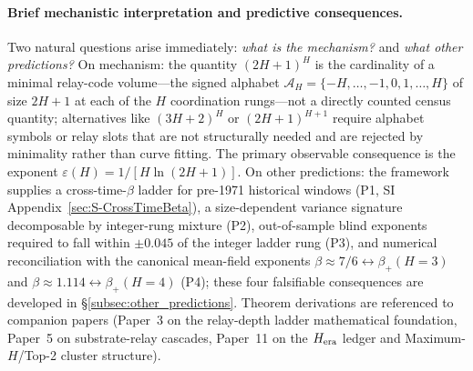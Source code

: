 \paragraph{Brief mechanistic interpretation and predictive consequences.}
Two natural questions arise immediately: \emph{what is the mechanism?} and \emph{what other predictions?}
On mechanism: the quantity \((2H+1)^H\) is the cardinality of a minimal relay-code volume---the signed alphabet \(\mathcal{A}_H=\{-H,\dots,-1,0,1,\dots,H\}\) of size \(2H+1\) at each of the \(H\) coordination rungs---not a directly counted census quantity; alternatives like \((3H+2)^H\) or \((2H+1)^{H+1}\) require alphabet symbols or relay slots that are not structurally needed and are rejected by minimality rather than curve fitting. The primary observable consequence is the exponent \(\varepsilon(H)=1/[H\ln(2H+1)]\).
On other predictions: the framework supplies a cross-time-\(\beta\) ladder for pre-1971 historical windows (P1, SI Appendix~\ref{sec:S-CrossTimeBeta}), a size-dependent variance signature decomposable by integer-rung mixture (P2), out-of-sample blind exponents required to fall within \(\pm 0.045\) of the integer ladder rung (P3), and numerical reconciliation with the canonical mean-field exponents \(\beta\!\approx\!7/6\leftrightarrow\beta_+(H{=}3)\) and \(\beta\!\approx\!1.114\leftrightarrow\beta_+(H{=}4)\) (P4); these four falsifiable consequences are developed in \S\ref{subsec:other_predictions}. Theorem derivations are referenced to companion papers (Paper~3 on the relay-depth ladder mathematical foundation, Paper~5 on substrate-relay cascades, Paper~11 on the \(H_{\rm era}\) ledger and Maximum-\(H\)/Top-2 cluster structure).


